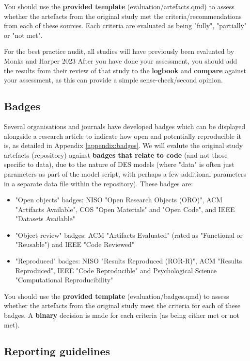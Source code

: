 You should use the \textbf{provided template} (evaluation/artefacts.qmd) to assess whether the artefacts from the original study met the criteria/recommendations from each of these sources. Each criteria are evaluated as being "fully", "partially" or "not met".

For the best practice audit, all studies will have previously been evaluated by Monks and Harper 2023\autocite{monks_computer_2023} After you have done your assessment, you should add the results from their review of that study to the \textbf{logbook} and \textbf{compare} against your assessment, as this can provide a simple sense-check/second opinion.

\vspace{0.5cm}
\subsection{Badges} \label{sec:badges}

Several organisations and journals have developed badges which can be displayed alongside a research article to indicate how open and potentially reproducible it is, as detailed in Appendix \ref{appendix:badges}. We will evalute the original study artefacts (repository) against \textbf{badges that relate to code} (and not those specific to data), due to the nature of DES models (where "data" is often just parameters as part of the model script, with perhaps a few additional parameters in a separate data file within the repository). These badges are:
\begin{itemize}
    \item "Open objects" badges: NISO "Open Research Objects (ORO)", ACM "Artifacts Available", COS "Open Materials" and "Open Code", and IEEE "Datasets Available"
    \item "Object review" badges: ACM "Artifacts Evaluated" (rated as "Functional or "Reusable") and IEEE "Code Reviewed"
    \item "Reproduced" badges: NISO "Results Reproduced (ROR-R)", ACM "Results Reproduced", IEEE "Code Reproducible" and Psychological Science "Computational Reproducibility"
\end{itemize}

You should use the \textbf{provided template} (evaluation/badges.qmd) to assess whether the artefacts from the original study meet the criteria for each of these badges. A \textbf{binary} decision is made for each criteria (as being either met or not met).

\subsection{Reporting guidelines} \label{sec:reporting}

